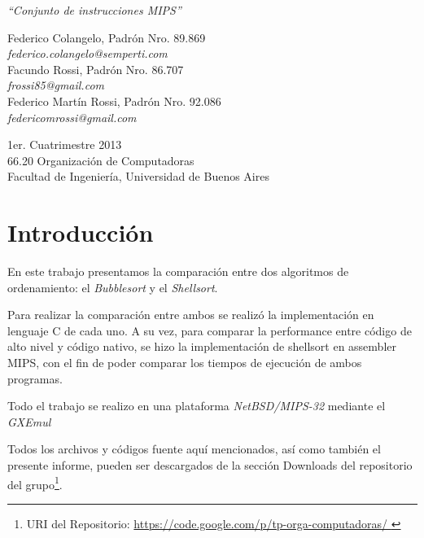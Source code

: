 \documentclass{article}
\begin{document}
\setcounter{page}{5}

\begin{titlepage}
	\vspace*{\fill}
	\begin{center}
		\Huge \textit{``Conjunto de instrucciones MIPS''} \\
		
		\bigskip\bigskip\bigskip\bigskip\bigskip

		\Large Federico Colangelo, Padrón Nro. 89.869 \\
		\large \textit{federico.colangelo@semperti.com} \\ \medskip
		\Large Facundo Rossi, Padrón Nro. 86.707 \\
		\large \textit{frossi85@gmail.com} \\ \medskip
		\Large Federico Martín Rossi, Padrón Nro. 92.086 \\
		\large \textit{federicomrossi@gmail.com} \\

		\bigskip\bigskip\bigskip\bigskip\bigskip\bigskip\bigskip

		\large 1er. Cuatrimestre 2013 \\ \smallskip
		\large 66.20 Organización de Computadoras \\ \smallskip
		\large Facultad de Ingeniería, Universidad de Buenos Aires \\ \smallskip

		\date{}
	\end{center}
	\vspace*{\fill}
\end{titlepage}

\newpage
\newpage \textit{}
\newpage



\tableofcontents
\newpage \textit{}
\newpage
{}




\section{Introducción}
	
	En este trabajo presentamos la comparación entre dos algoritmos de ordenamiento:  el \textit{Bubblesort} y el \textit{Shellsort}.
	\par
	Para realizar la comparación entre ambos se realizó la implementación en lenguaje C de cada uno. A su vez, para comparar la performance entre código de alto nivel y código nativo, se hizo la implementación de shellsort en assembler MIPS, con el fin de poder comparar los tiempos de ejecución de ambos programas.
	\par
	Todo el trabajo se realizo en una plataforma \textit{NetBSD/MIPS-32} mediante el \textit{GXEmul} \cite{GXEMUL}
	\par
	Todos los archivos y códigos fuente aquí mencionados, así como también el presente informe, pueden ser
descargados de la sección Downloads del repositorio del grupo\footnote{URI del Repositorio: \url{https://code.google.com/p/tp-orga-computadoras/ }}.
\bigskip
\end{document}
